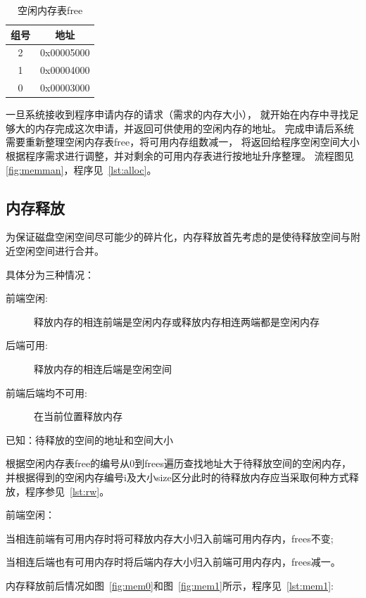 \begin{table}[h]
  \centering
  \begin{tabular}{|c|c|}
    \hline 组号 & 地址 \\
    \hline 2 & 0x00005000 \\ 
    \hline 1 & 0x00004000 \\
    \hline 0 & 0x00003000 \\
    \hline
  \end{tabular}
  \caption{空闲内存表free}
  \label{tab:free}
\end{table}

一旦系统接收到程序申请内存的请求（需求的内存大小），
就开始在内存中寻找足够大的内存完成这次申请，并返回可供使用的空闲内存的地址。
完成申请后系统需要重新整理空闲内存表free，将可用内存组数减一，
将返回给程序空闲空间大小根据程序需求进行调整，并对剩余的可用内存表进行按地址升序整理。
流程图见\ref{fig:memman}，程序见~\ref{lst:alloc}。


\subsection{内存释放}

为保证磁盘空闲空间尽可能少的碎片化，内存释放首先考虑的是使待释放空间与附近空闲空间进行合并\cite{bryant2003computer}。

具体分为三种情况：

\begin{description}
\item[前端空闲:]释放内存的相连前端是空闲内存或释放内存相连两端都是空闲内存
\item[后端可用:]释放内存的相连后端是空闲空间
\item[前端后端均不可用:]在当前位置释放内存
\end{description}

已知：待释放的空间的地址和空间大小

根据空闲内存表free的编号从0到frees遍历查找地址大于待释放空间的空闲内存，
并根据得到的空闲内存编号i及大小size区分此时的待释放内存应当采取何种方式释放，程序参见~\ref{lst:rw}。

前端空闲：

当相连前端有可用内存时将可释放内存大小归入前端可用内存内，frees不变;

当相连后端也有可用内存时将后端内存大小归入前端可用内存内，frees减一。

内存释放前后情况如图~\ref{fig:mem0}和图~\ref{fig:mem1}所示，程序见~\ref{lst:mem1}: 

